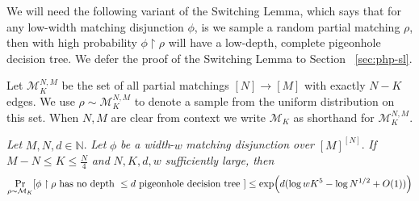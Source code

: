 We will need the following variant of the Switching Lemma, which says that for any  low-width matching disjunction $\phi$, is we sample a random partial matching $\rho$, then with high probability $\phi\upharpoonright\rho$ will have a low-depth, complete pigeonhole decision tree. We defer the proof of the Switching Lemma to Section ~\ref{sec:php-sl}.

\begin{definition} 
\label{}
Let $\mathcal{M}^{N,M}_K$ be the set of all partial matchings $[N] \to [M]$ with exactly $N - K$ edges. We use $\rho \sim \mathcal{M}^{N,M}_K$ to denote a sample from the uniform distribution on this set. When $N,M$ are clear from context we write $\mathcal{M}_K$ as shorthand for $\mathcal{M}^{N,M}_K$.  
\end{definition} 

\begin{lemma}
\label{lem:switching-main} 
{\it Let} $M,N,d \in \mathbb{N}$. 
{\it Let} $\phi$ {\it be a width}-$w$ {\it matching disjunction over} $[M]^{[N]}$. 
{\it If} $M-N \leq K \leq \frac{N}{4}$ {\it and} $N,K,d,w$ {\it sufficiently large, then}
\[
\Pr_{\rho \sim \mathcal{M}_K} [\phi\upharpoonright \rho \text{ has no depth } \leq d \text{ pigeonhole decision tree }] \leq \exp\Bigl(d (\log wK^5 -\log N^{1/2} + O(1))\Bigr)\]
\end{lemma}

